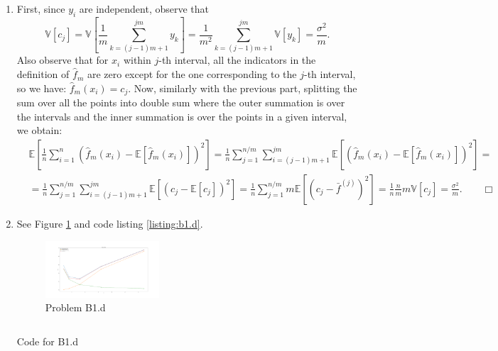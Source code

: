 \documentclass{article}
\newcommand{\1}{\mathbf{1}}
\newcommand{\E}{\mathbb{E}}
\newcommand{\V}{\mathbb{V}}
\begin{document}
\begin{enumerate}
    \item First, since $y_i$ are independent, observe that $$
    \V[c_j] = \V[\frac{1}{m} \sum_{k=(j-1)m+1}^{jm} y_k] = \frac{1}{m^2} \sum_{k=(j-1)m+1}^{jm} \V[y_k] = \frac{\sigma^2}{m}.
    $$
    Also observe that for $x_i$ within $j$-th interval, all the indicators in the definition of $\widehat{f}_m$ are zero except for the one corresponding to the $j$-th interval, so we have: $\widehat{f}_m (x_i) = c_j$.
    Now, similarly with the previous part, splitting the sum over all the points into double sum where the outer summation is over the intervals and the inner summation is over the points in a given interval, we obtain:
    \begin{align*}
                & \E\left[\frac{1}{n} \sum_{i=1}^{n} ( \widehat{f}_m (x_i) - \E[ \widehat{f}_m(x_i)])^2\right] =
                \frac{1}{n} \sum_{j=1}^{n/m} \sum_{i=(j-1)m+1}^{jm} \E[( \widehat{f}_m (x_i) - \E[\widehat{f}_m(x_i)])^2] =\\
                & = \frac{1}{n} \sum_{j=1}^{n/m} \sum_{i=(j-1)m+1}^{jm} \E[( c_j - \E[c_j])^2] =
                \boxed{\frac{1}{n} \sum_{j=1}^{n/m} m \E[( c_j - \bar{f}^{(j)})^2]} = \frac{1}{n}\frac{n}{m}m\V[c_j]
                = \boxed{\frac{\sigma^2}{m}}. \qquad \Box
            \end{align*}
    \item See Figure \ref{figure:b1.d} and code listing \ref{listing:b1.d}.
         \begin{figure}[h!]
            \centering
            \includegraphics[width=0.4\textwidth]{code/b1_d.pdf}
            \caption{Problem B1.d}
            \label{figure:b1.d}
         \end{figure}
         
         \begin{listing}[ht]
          \inputminted{python}{code/b1_d.py}
          \caption{Code for B1.d}
          \label{listing:b1.d}
         \end{listing}
   

\end{enumerate}
\end{document}
